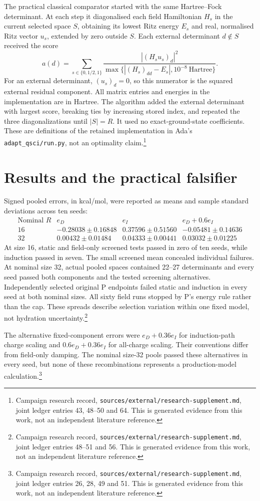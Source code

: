 \documentclass{article}
\newcommand{\record}[1]{\footnote{Campaign research record, \texttt{sources/external/research-supplement.md}, #1. This is generated evidence from this work, not an independent literature reference.}}
\begin{document}
The practical classical comparator started with the same Hartree--Fock determinant. At each step it diagonalised each field Hamiltonian \(H_s\) in the current selected space \(S\), obtaining its lowest Ritz energy \(E_s\) and real, normalised Ritz vector \(u_s\), extended by zero outside \(S\). Each external determinant \(d\notin S\) received the score
\[
 a(d)=\sum_{s\in\{0,1/2,1\}}
 \frac{|(H_su_s)_d|^2}{\max\{|(H_s)_{dd}-E_s|,10^{-8}\ \mathrm{Hartree}\}}.
\]
For an external determinant, \((u_s)_d=0\), so this numerator is the squared external residual component. All matrix entries and energies in the implementation are in Hartree. The algorithm added the external determinant with largest score, breaking ties by increasing stored index, and repeated the three diagonalizations until \(|S|=R\). It used no exact-ground-state coefficients. These are definitions of the retained implementation in Ada's \texttt{adapt\_qsci/run.py}, not an optimality claim.\record{joint ledger entries 43, 48--50 and 64}

\section{Results and the practical falsifier}
Signed pooled errors, in kcal/mol, were reported as means and sample standard deviations across ten seeds:
\[
\begin{array}{c|rrr}
 \text{Nominal }R&e_D&e_I&e_D+0.6e_I\\ \hline
16&-0.28038\pm0.16848&0.37596\pm0.51560&-0.05481\pm0.14636\\
32&0.00432\pm0.01484&0.04333\pm0.00441&0.03032\pm0.01225
\end{array}
\]
At size 16, static and field-only screened tests passed in zero of ten seeds, while induction passed in seven. The small screened mean concealed individual failures. At nominal size 32, actual pooled spaces contained 22--27 determinants and every seed passed both components and the tested screening alternatives. Independently selected original P endpoints failed static and induction in every seed at both nominal sizes. All sixty field runs stopped by P's energy rule rather than the cap. These spreads describe selection variation within one fixed model, not hydration uncertainty.\record{joint ledger entries 48--51 and 56}

The alternative fixed-component errors were \(e_D+0.36e_I\) for induction-path charge scaling and \(0.6e_D+0.36e_I\) for all-charge scaling. Their conventions differ from field-only damping. The nominal size-32 pools passed these alternatives in every seed, but none of these recombinations represents a production-model calculation.\record{joint ledger entries 26, 28, 49 and 51}
\end{document}
